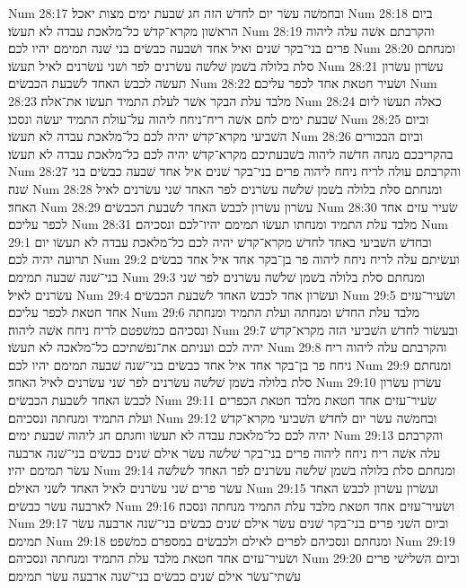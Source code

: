 Num 28:17  ובחמשׁה עשׂר יום לחדשׁ הזה חג שׁבעת ימים מצות יאכל׃
Num 28:18  ביום הראשׁון מקרא־קדשׁ כל־מלאכת עבדה לא תעשׂו׃
Num 28:19  והקרבתם אשׁה עלה ליהוה פרים בני־בקר שׁנים ואיל אחד ושׁבעה כבשׂים בני שׁנה תמימם יהיו לכם׃
Num 28:20  ומנחתם סלת בלולה בשׁמן שׁלשׁה עשׂרנים לפר ושׁני עשׂרנים לאיל תעשׂו׃
Num 28:21  עשׂרון עשׂרון תעשׂה לכבשׂ האחד לשׁבעת הכבשׂים׃
Num 28:22  ושׂעיר חטאת אחד לכפר עליכם׃
Num 28:23  מלבד עלת הבקר אשׁר לעלת התמיד תעשׂו את־אלה׃
Num 28:24  כאלה תעשׂו ליום שׁבעת ימים לחם אשׁה ריח־ניחח ליהוה על־עולת התמיד יעשׂה ונסכו׃
Num 28:25  וביום השׁביעי מקרא־קדשׁ יהיה לכם כל־מלאכת עבדה לא תעשׂו׃
Num 28:26  וביום הבכורים בהקריבכם מנחה חדשׁה ליהוה בשׁבעתיכם מקרא־קדשׁ יהיה לכם כל־מלאכת עבדה לא תעשׂו׃
Num 28:27  והקרבתם עולה לריח ניחח ליהוה פרים בני־בקר שׁנים איל אחד שׁבעה כבשׂים בני שׁנה׃
Num 28:28  ומנחתם סלת בלולה בשׁמן שׁלשׁה עשׂרנים לפר האחד שׁני עשׂרנים לאיל האחד׃
Num 28:29  עשׂרון עשׂרון לכבשׂ האחד לשׁבעת הכבשׂים׃
Num 28:30  שׂעיר עזים אחד לכפר עליכם׃
Num 28:31  מלבד עלת התמיד ומנחתו תעשׂו תמימם יהיו־לכם ונסכיהם׃
Num 29:1  ובחדשׁ השׁביעי באחד לחדשׁ מקרא־קדשׁ יהיה לכם כל־מלאכת עבדה לא תעשׂו יום תרועה יהיה לכם׃
Num 29:2  ועשׂיתם עלה לריח ניחח ליהוה פר בן־בקר אחד איל אחד כבשׂים בני־שׁנה שׁבעה תמימם׃
Num 29:3  ומנחתם סלת בלולה בשׁמן שׁלשׁה עשׂרנים לפר שׁני עשׂרנים לאיל׃
Num 29:4  ועשׂרון אחד לכבשׂ האחד לשׁבעת הכבשׂים׃
Num 29:5  ושׂעיר־עזים אחד חטאת לכפר עליכם׃
Num 29:6  מלבד עלת החדשׁ ומנחתה ועלת התמיד ומנחתה ונסכיהם כמשׁפטם לריח ניחח אשׁה ליהוה׃
Num 29:7  ובעשׂור לחדשׁ השׁביעי הזה מקרא־קדשׁ יהיה לכם ועניתם את־נפשׁתיכם כל־מלאכה לא תעשׂו׃
Num 29:8  והקרבתם עלה ליהוה ריח ניחח פר בן־בקר אחד איל אחד כבשׂים בני־שׁנה שׁבעה תמימם יהיו לכם׃
Num 29:9  ומנחתם סלת בלולה בשׁמן שׁלשׁה עשׂרנים לפר שׁני עשׂרנים לאיל האחד׃
Num 29:10  עשׂרון עשׂרון לכבשׂ האחד לשׁבעת הכבשׂים׃
Num 29:11  שׂעיר־עזים אחד חטאת מלבד חטאת הכפרים ועלת התמיד ומנחתה ונסכיהם׃
Num 29:12  ובחמשׁה עשׂר יום לחדשׁ השׁביעי מקרא־קדשׁ יהיה לכם כל־מלאכת עבדה לא תעשׂו וחגתם חג ליהוה שׁבעת ימים׃
Num 29:13  והקרבתם עלה אשׁה ריח ניחח ליהוה פרים בני־בקר שׁלשׁה עשׂר אילם שׁנים כבשׂים בני־שׁנה ארבעה עשׂר תמימם יהיו׃
Num 29:14  ומנחתם סלת בלולה בשׁמן שׁלשׁה עשׂרנים לפר האחד לשׁלשׁה עשׂר פרים שׁני עשׂרנים לאיל האחד לשׁני האילם׃
Num 29:15  ועשׂרון עשׂרון לכבשׂ האחד לארבעה עשׂר כבשׂים׃
Num 29:16  ושׂעיר־עזים אחד חטאת מלבד עלת התמיד מנחתה ונסכה׃
Num 29:17  וביום השׁני פרים בני־בקר שׁנים עשׂר אילם שׁנים כבשׂים בני־שׁנה ארבעה עשׂר תמימם׃
Num 29:18  ומנחתם ונסכיהם לפרים לאילם ולכבשׂים במספרם כמשׁפט׃
Num 29:19  ושׂעיר־עזים אחד חטאת מלבד עלת התמיד ומנחתה ונסכיהם׃
Num 29:20  וביום השׁלישׁי פרים עשׁתי־עשׂר אילם שׁנים כבשׂים בני־שׁנה ארבעה עשׂר תמימם׃

